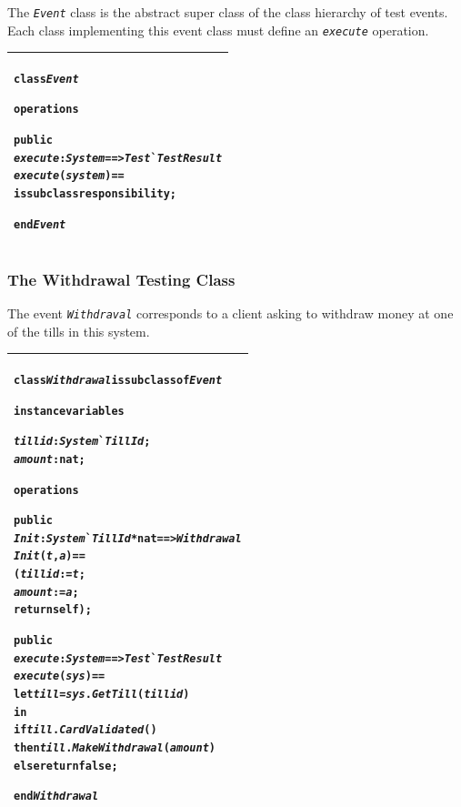 \documentclass[\pformat,12pt,twoside]{article}
\newenvironment{VDMgray}%
{\begin{tabular}{|G|}\hline\small\begin{alltt}}%
{\end{alltt}\normalsize\\
 \hline\end{tabular}}
\begin{document}
The \texttt{\emph{Event}} class is the abstract super class of the class 
hierarchy of test events. Each class implementing this event 
class must define an \texttt{\emph{execute}} operation.

\begin{VDMgray}
\textbf{class} \textit{Event}

\textbf{operations}

 \textbf{public}
 \textit{execute} : \textit{System} ==\texttt{>} \textit{Test}\`{}\textit{TestResult}
 \textit{execute} (\textit{system}) ==
    \textbf{is} \textbf{subclass} \textbf{responsibility};

\textbf{end} \textit{Event}
\end{VDMgray}

\newpage

\subsubsection{The Withdrawal Testing Class}

The event \texttt{\emph{Withdraval}} corresponds to a client asking to withdraw 
money at one of the tills in this system.

\begin{VDMgray}
\textbf{class} \textit{Withdrawal} \textbf{is} \textbf{subclass} \textbf{of} \textit{Event}

\textbf{instance} \textbf{variables}

 \textit{tillid} : \textit{System}\`{}\textit{TillId};
 \textit{amount} : \textbf{nat};

\textbf{operations}

 \textbf{public}
 \textit{Init}: \textit{System}\`{}\textit{TillId} * \textbf{nat} ==\texttt{>} \textit{Withdrawal}
 \textit{Init}(\textit{t},\textit{a}) ==
   (\textit{tillid} := \textit{t};
    \textit{amount} := \textit{a};
    \textbf{return} \textbf{self});

 \textbf{public}
 \textit{execute}: \textit{System} ==\texttt{>} \textit{Test}\`{}\textit{TestResult}
 \textit{execute}(\textit{sys}) ==
   \textbf{let} \textit{till} = \textit{sys}.\textit{GetTill}(\textit{tillid})
   \textbf{in}
      \textbf{if} \textit{till}.\textit{CardValidated}()
      \textbf{then} \textit{till}.\textit{MakeWithdrawal}(\textit{amount})
      \textbf{else} \textbf{return} \textbf{false};

\textbf{end} \textit{Withdrawal}
\end{VDMgray}

\newpage
\end{document}
